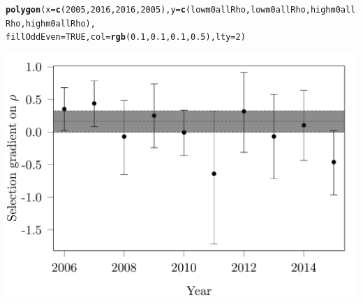 \documentclass{article}\usepackage[]{graphicx}\usepackage[]{color}
\makeatletter
\def\maxwidth{ %
  \ifdim\Gin@nat@width>\linewidth
    \linewidth
  \else
    \Gin@nat@width
  \fi
}
\newcommand{\hlnum}[1]{\textcolor[rgb]{0.686,0.059,0.569}{#1}}%
\newcommand{\hlstd}[1]{\textcolor[rgb]{0.345,0.345,0.345}{#1}}%
\newcommand{\hlkwc}[1]{\textcolor[rgb]{0.333,0.667,0.333}{#1}}%
\newcommand{\hlkwd}[1]{\textcolor[rgb]{0.737,0.353,0.396}{\textbf{#1}}}%
\newenvironment{kframe}{%
 \def\at@end@of@kframe{}%
 \ifinner\ifhmode%
  \def\at@end@of@kframe{\end{minipage}}%
  \begin{minipage}{\columnwidth}%
 \fi\fi%
 \def\FrameCommand##1{\hskip\@totalleftmargin \hskip-\fboxsep
 \colorbox{shadecolor}{##1}\hskip-\fboxsep
     \hskip-\linewidth \hskip-\@totalleftmargin \hskip\columnwidth}%
 \MakeFramed {\advance\hsize-\width
   \@totalleftmargin\z@ \linewidth\hsize
   \@setminipage}}%
 {\par\unskip\endMakeFramed%
 \at@end@of@kframe}
\newenvironment{knitrout}{}{} %
\makeatother
\begin{document}
\begin{knitrout}
\begin{kframe}
\begin{alltt}
\hlkwd{polygon}\hlstd{(}\hlkwc{x}\hlstd{=}\hlkwd{c}\hlstd{(}\hlnum{2005}\hlstd{,}\hlnum{2016}\hlstd{,}\hlnum{2016}\hlstd{,}\hlnum{2005}\hlstd{),}\hlkwc{y}\hlstd{=}\hlkwd{c}\hlstd{(lowm0allRho,lowm0allRho, highm0allRho, highm0allRho),}
        \hlkwc{fillOddEven} \hlstd{=} \hlnum{TRUE}\hlstd{,} \hlkwc{col}\hlstd{=}\hlkwd{rgb}\hlstd{(}\hlnum{0.1}\hlstd{,}\hlnum{0.1}\hlstd{,}\hlnum{0.1}\hlstd{,}\hlnum{0.5}\hlstd{),} \hlkwc{lty}\hlstd{=}\hlnum{2}\hlstd{)}
\end{alltt}
\end{kframe}
\includegraphics[width=\maxwidth]{figure/SelByYearRho-1} 

\end{knitrout}
\end{document}

